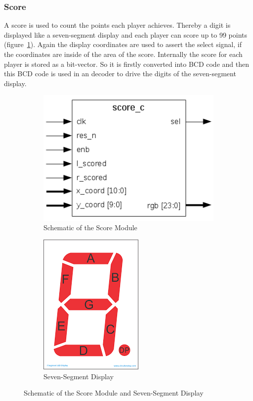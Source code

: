         \subsubsection{Score}
            A score is used to count the points each player achieves. Thereby a digit is displayed like a seven-segment display and each player can score up to 99 points (figure~\ref{score_sch}). Again the display coordinates are used to assert the select signal, if the coordinates are inside of the area of the score. Internally the score for each player is stored as a bit-vector. So it is firstly converted into BCD code and then this BCD code is used in an decoder to drive the digits of the seven-segment display.
\begin{figure}[h]
		\begin{subfigure}[b]{.5\textwidth}
            \centering
			\includegraphics[scale=0.7]{images/score_schematic.png}
			\caption{Schematic of the Score Module}
		\end{subfigure}
		\hfill
		\begin{subfigure}[b]{.5\textwidth}
            \centering
			\includegraphics[scale=0.5]{images/seven_segment_display.png}		
			\caption{Seven-Segment Display}
		\end{subfigure}
        \caption{Schematic of the Score Module and Seven-Segment Display}
	    \label{score_sch}
	\end{figure}
		

